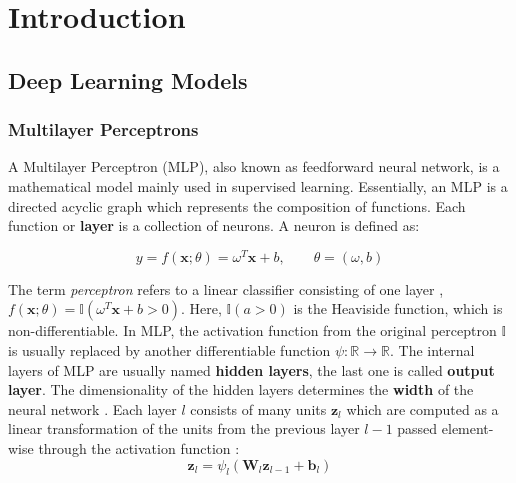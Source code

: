 \chapter{Introduction}
\label{ch:Introduction}

\section{Deep Learning Models}

\subsection{Multilayer Perceptrons}
A Multilayer Perceptron (MLP), also known as feedforward neural network, is a mathematical model mainly used in supervised learning. Essentially, an MLP is a directed acyclic graph which represents the composition of functions. Each function or \textbf{layer} is a collection of neurons. A neuron is defined as:

\begin{equation}
    \label{eqn:neuron}
    y = f(\mathbf{x}; \theta) = \omega^T \mathbf{x} + b, \qquad \theta = (\omega, b)
\end{equation}

The term \textit{perceptron} refers to a linear classifier consisting of one layer \cite{rosenblatt1958}, $f(\mathbf{x}; \theta) = \mathbb{I}(\omega^T \mathbf{x} + b > 0)$.
Here, $\mathbb{I}(a>0)$ is the Heaviside function, which is non-differentiable. In MLP, the activation function from the original perceptron $\mathbb{I}$ is usually replaced by another differentiable function $\psi \colon \mathbb{R} \to \mathbb{R}$. The internal layers of MLP are usually named \textbf{hidden layers}, the last one is called \textbf{output layer}. The dimensionality of the hidden layers determines the \textbf{width} of the neural network \cite{goodfellow2016}. Each layer $l$ consists of many units $\mathbf{z}_l$ which are computed as a linear transformation of the units from the previous layer $l-1$ passed element-wise through the activation function \cite{murphy2022}:
\begin{equation*}
    \mathbf{z}_l = \psi_l (\mathbf{W}_l \mathbf{z}_{l-1} + \mathbf{b}_l)
\end{equation*}

